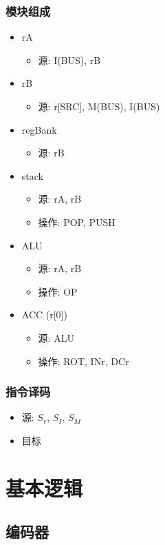 \documentclass[10pt]{book}
\begin{document}
\subsection{模块组成}
\begin{itemize}
  \item rA
  \begin{itemize}
    \item 源: I(BUS), rB
  \end{itemize}
  \item rB
  \begin{itemize}
    \item 源: r[SRC], M(BUS), I(BUS)
  \end{itemize}
  \item regBank
  \begin{itemize}
    \item 源: rB
  \end{itemize}
  \item stack
  \begin{itemize}
    \item 源: rA, rB
    \item 操作: POP, PUSH
  \end{itemize}
  \item ALU
  \begin{itemize}
    \item 源: rA, rB
    \item 操作: OP
  \end{itemize}
  \item ACC (r[0])
  \begin{itemize}
    \item 源: ALU
    \item 操作: ROT, INr, DCr
  \end{itemize}
\end{itemize}

\subsection{指令译码}
\begin{itemize}
  \item 源: $S_{r}$, $S_{I}$, $S_{M}$
  \item 目标
\end{itemize}


\chapter{基本逻辑}
\section{编码器}
\end{document}

